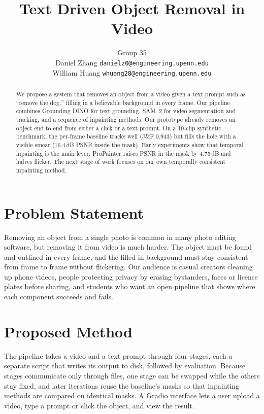 \documentclass[11pt]{article}
\title{\vspace{-30pt}Text Driven Object Removal in Video}
\author{
  Group 35\\
  Daniel Zhang \quad \texttt{danielz0@engineering.upenn.edu}\\
  William Huang \quad \texttt{whuang28@engineering.upenn.edu}
}
\begin{document}
\maketitle
\vspace{-20pt}
\begin{abstract}
We propose a system that removes an object from a video given a text prompt such as ``remove the dog,'' filling in a believable background in every frame. Our pipeline combines Grounding DINO for text grounding, SAM~2 for video segmentation and tracking, and a sequence of inpainting methods. Our prototype already removes an object end to end from either a click or a text prompt. On a 10-clip synthetic benchmark, the per-frame baseline tracks well (J\&F 0.943) but fills the hole with a visible smear (16.4\,dB PSNR inside the mask). Early experiments show that temporal inpainting is the main lever: ProPainter raises PSNR in the mask by 4.75\,dB and halves flicker. The next stage of work focuses on our own temporally consistent inpainting method.
\end{abstract}

\section{Problem Statement}
Removing an object from a single photo is common in many photo editing software, but removing it from video is much harder. The object must be found and outlined in every frame, and the filled-in background must stay consistent from frame to frame without flickering. Our audience is casual creators cleaning up phone videos, people protecting privacy by erasing bystanders, faces or license plates before sharing, and students who want an open pipeline that shows where each component succeeds and fails.

\section{Proposed Method}
The pipeline takes a video and a text prompt through four stages, each a separate script that writes its output to disk, followed by evaluation. Because stages communicate only through files, one stage can be swapped while the others stay fixed, and later iterations reuse the baseline's masks so that inpainting methods are compared on identical masks. A Gradio interface lets a user upload a video, type a prompt or click the object, and view the result.
\end{document}
